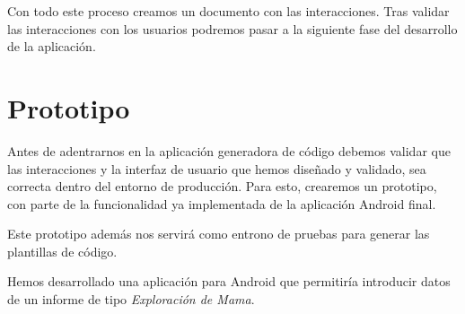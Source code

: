 Con todo este proceso creamos un documento con las interacciones. Tras validar las interacciones con los usuarios podremos pasar a la siguiente fase del desarrollo de la aplicación.\par

\clearpage
\section{Prototipo}\label{prototipo}

Antes de adentrarnos en la aplicación generadora de código debemos validar que las interacciones y la interfaz de usuario que hemos diseñado y validado, sea correcta dentro del entorno de producción. Para esto, crearemos un prototipo, con parte de la funcionalidad ya implementada de la aplicación Android final.\par

Este prototipo además nos servirá como entrono de pruebas para generar las plantillas de código.\medskip\par

Hemos desarrollado una aplicación para Android que permitiría introducir datos de un informe de tipo \emph{Exploración de Mama}.\medskip\par

